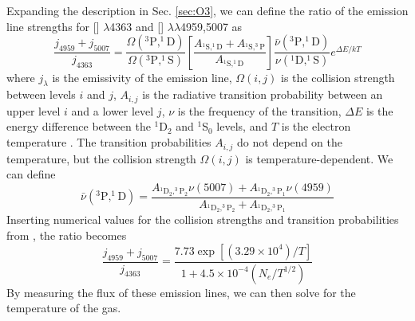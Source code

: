 %

Expanding the description in Sec. \ref{sec:O3}, we can define the ratio of the 
emission line strengths for [] $\lambda$4363 and [] 
$\lambda \lambda$4959,5007 as
\begin{equation}
    \frac{j_{4959} + j_{5007}}{j_{4363}} = \frac{\Omega(^3\text{P}, ^1\text{D})}{\Omega(^3\text{P}, ^1\text{S})} \left[ \frac{A_{^1\text{S}, ^1\text{D}} + A_{^1\text{S}, ^3\text{P}}}{A_{^1\text{S}, ^1\text{D}}} \right] \frac{\bar{\nu}(^3\text{P}, ^1\text{D})}{\nu(^1\text{D}, ^1\text{S})} e^{\Delta E/kT}
\end{equation}
where $j_\lambda$ is the emissivity of the emission line, $\Omega (i,j)$ is the 
collision strength between levels $i$ and $j$, $A_{i,j}$ is the radiative 
transition probability between an upper level $i$ and a lower level $j$, $\nu$ 
is the frequency of the transition, $\Delta E$ is the energy difference between 
the $^1$D$_2$ and $^1$S$_0$ levels, and $T$ is the electron temperature 
\citep{Osterbrock89}.  The transition probabilities $A_{i,j}$ do not depend on 
the temperature, but the collision strength $\Omega (i,j)$ is 
temperature-dependent.  We can define
\begin{equation}
    \bar{\nu}(^3\text{P}, ^1\text{D}) = \frac{A_{^1\text{D}_2, ^3\text{P}_2} \nu (5007) + A_{^1\text{D}_2, ^3\text{P}_1} \nu (4959)}{A_{^1\text{D}_2, ^3\text{P}_2} + A_{^1\text{D}_2, ^3\text{P}_1}}
\end{equation}
Inserting numerical values for the collision strengths and transition 
probabilities from \cite{Osterbrock89}, the ratio becomes
\begin{equation}
    \frac{j_{4959} + j_{5007}}{j_{4363}} = \frac{7.73 \exp[(3.29\times 10^4)/T]}{1 + 4.5\times 10^{-4} (N_e/T^{1/2})}
\end{equation}
By measuring the flux of these emission lines, we can then solve for the 
temperature of the gas.


